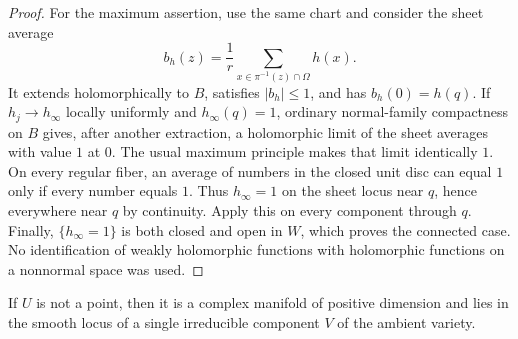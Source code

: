 \begin{proof}
For the maximum assertion, use the same chart and consider the sheet average
\[
  b_h(z)=\frac1r\sum_{x\in\pi^{-1}(z)\cap\Omega}h(x).
\]
It extends holomorphically to $B$, satisfies $|b_h|\leq1$, and has $b_h(0)=h(q)$.  If $h_j\to h_\infty$ locally uniformly and $h_\infty(q)=1$, ordinary normal-family compactness on $B$ gives, after another extraction, a holomorphic limit of the sheet averages with value $1$ at $0$.  The usual maximum principle makes that limit identically $1$.  On every regular fiber, an average of numbers in the closed unit disc can equal $1$ only if every number equals $1$.  Thus $h_\infty=1$ on the sheet locus near $q$, hence everywhere near $q$ by continuity.  Apply this on every component through $q$.  Finally, $\{h_\infty=1\}$ is both closed and open in $W$, which proves the connected case.  No identification of weakly holomorphic functions with holomorphic functions on a nonnormal space was used.
\end{proof}

\begin{proposition}\label{prop:smoothness}
If $U$ is not a point, then it is a complex manifold of positive dimension and lies in the smooth locus of a single irreducible component $V$ of the ambient variety.
\end{proposition}

